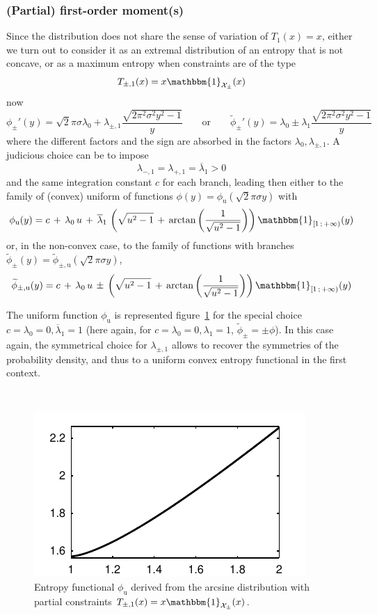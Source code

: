 \documentclass[english,sort&compress]{elsarticle}
\theoremstyle{definition}
\theoremstyle{plain}
\theoremstyle{plain}
\def\X{\mathcal{X}}
\def\un{\mathbbm{1}}
\begin{document}

\subsubsection{(Partial) first-order moment(s)}

Since the  distribution does not share the  sense of variation of  $T_1(x) = x$,
either we turn out to consider it as an extremal distribution of an entropy that
is not concave, or as a maximum entropy when constraints are of the type
%
\[
T_{\pm,1}(x) = x \un_{\X_\pm}(x)
\]
%
now 
%
\[
\phi_\pm'(y) = \sqrt2 \pi \sigma \lambda_0 + \lambda_{\pm,1} \frac{\sqrt{2 \pi^2
    \sigma^2  y^2 -  1}}{y} \qquad  \mbox{or} \qquad  \widetilde{\phi}_\pm'(y) =
\lambda_0 \pm \lambda_1 \frac{\sqrt{2 \pi^2 \sigma^2 y^2 - 1}}{y}
\]
%
where  the  different  factors  and  the  sign  are  absorbed  in  the  factors
$\lambda_0, \lambda_{\pm,1}$. A judicious choice can be to impose
%
\[
\lambda_{-,1} = \lambda_{+,1} = \overline{\lambda}_1 > 0
\]
%
and the  same integration constant $c$  for each branch, leading  then either to
the family of (convex)  uniform of functions $\phi(y) = \phi_{\mathrm{u}}(\sqrt2
\pi \sigma y)$ with
%
\[
\phi_{\mathrm{u}}(y) = c \, + \,  \lambda_0 \, u \, + \, \overline{\lambda}_1 \,
\left( \sqrt{u^2  - 1}  \, + \,  \arctan\left( \frac{1}{\sqrt{u^2 -  1}} \right)
\right) \un_{\left[1 \, ; \, +\infty \right)}(y)
\]
%
or,  in  the  non-convex  case,   to  the  family  of  functions  with  branches
$\widetilde{\phi}_{\pm}(y) = \widetilde{\phi}_{\pm,\mathrm{u}}(\sqrt2 \pi \sigma
y)$,
%
\[
\widetilde{\phi}_{\pm,\mathrm{u}}(y) = c \, + \, \lambda_0 \, u \, \pm \, \left(
  \sqrt{u^2 - 1} \, +  \, \arctan\left( \frac{1}{\sqrt{u^2 - 1}} \right) \right)
\un_{\left[ 1 \, ; \, +\infty \right)}(y)
\]


The      uniform      function      $\phi_{\mathrm{u}}$      is      represented
figure~\ref{fig:Entropy-arcsin}  for the  special  choice $c  =  \lambda_0 =  0,
\overline{\lambda}_1 = 1$  (here again, for $c = \lambda_0 =  0, \lambda_1 = 1$,
$\widetilde{\phi}_\pm = \pm \phi$).  In  this case again, the symmetrical choice
for  $\lambda_{\pm,1}$  allows to  recover  the  symmetries  of the  probability
density, and thus to a uniform convex entropy functional in the first context.

\
 
\begin{figure}[htbp]
\centerline{\includegraphics[width=.43\textwidth]{PDF/MaxEnt_ArcsineLaw}}
\caption{Entropy  functional   $\phi_{\mathrm{u}}$  derived  from   the  arcsine
  distribution with partial constraints $T_{\pm,1}(x) = x \un_{\X_\pm}(x)$.}
\label{fig:Entropy-arcsin}
\end{figure}
\end{document}
